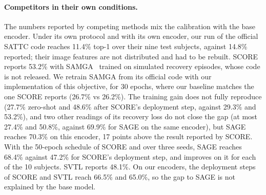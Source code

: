 \documentclass[10pt,twocolumn,letterpaper]{article}
\begin{document}
\paragraph{Competitors in their own conditions.}
The numbers reported by competing methods mix the calibration with the base encoder. Under its own protocol and with its own encoder, our run of the official SATTC code reaches 11.4\% top-1 over their nine test subjects, against 14.8\% reported; their image features are not distributed and had to be rebuilt. SCORE reports 53.2\% with SAMGA~\cite{jiang2026samga} trained on simulated recovery episodes, whose code is not released. We retrain SAMGA from its official code with our implementation of this objective, for 30 epochs, where our baseline matches the one SCORE reports (26.7\% vs 26.2\%). The training gain does not fully reproduce (27.7\% zero-shot and 48.6\% after SCORE's deployment step, against 29.3\% and 53.2\%), and two other readings of its recovery loss do not close the gap (at most 27.4\% and 50.8\%, against 69.9\% for SAGE on the same encoder), but SAGE reaches 70.3\% on this encoder, 17 points above the result reported by SCORE. With the 50-epoch schedule of SCORE and over three seeds, SAGE reaches 68.4\% against 47.2\% for SCORE's deployment step, and improves on it for each of the 10 subjects. SVTL reports 48.1\%. On our encoders, the deployment steps of SCORE and SVTL reach 66.5\% and 65.0\%, so the gap to SAGE is not explained by the base model.
\end{document}
